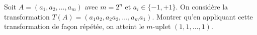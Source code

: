 Soit $A = (a_1, a_2, \ldots, a_m)$ avec $m = 2^n$ et $a_i \in \{-1, +1\}$. On considère la transformation $T(A) = (a_1a_2, a_2a_3, \ldots, a_ma_1)$. Montrer qu'en appliquant cette transformation de façon répétée, on atteint le $m$-uplet $(1, 1, \ldots, 1)$.
